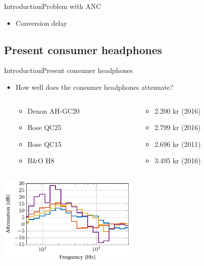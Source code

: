 \begin{frame}{Introduction}{Problem with ANC}		
	\begin{itemize}
		\item Conversion delay
	\end{itemize}
\end{frame}

\subsection{Present consumer headphones}
\begin{frame}{Introduction}{Present consumer headphones}
	\begin{itemize}	
	\item How well does the consumer headphones attenuate?
	\begin{columns}
		\begin{column}{0.27\textwidth}
		\begin{itemize}
			\item Denon AH-GC20
			\item Bose QC25 
			\item Bose QC15 	
			\item B\&O H8 	
		\end{itemize}
		\end{column}
		\begin{column}{0.6\textwidth} 
		\begin{itemize}
			\item[] 2.200 kr (2016)
			\item[] 2.799 kr (2016)
			\item[] 2.696 kr (2011)
			\item[] 3.495 kr (2016)
		\end{itemize}
		\end{column}
	\end{columns}
	\end{itemize}			
	\begin{center}
		\includegraphics[width=0.5\textwidth]{figures/ComparedConusmerHP}
	\end{center}	
\end{frame}





